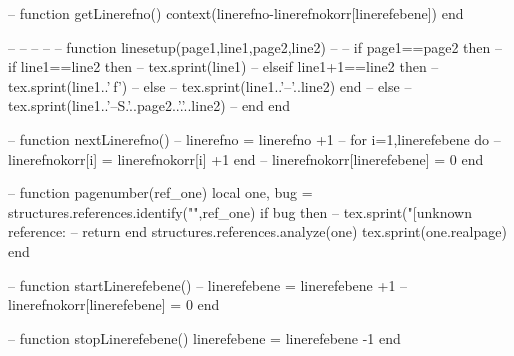 --%
function getLinerefno()
		context(linerefno-linerefnokorr[linerefebene])
end

--%
--%
--%
--%
--%
function linesetup(page1,line1,page2,line2)
	--%
--	if page1==page2 then
		--%
		if line1==line2 then
			--%
			tex.sprint(line1)
		--%
		elseif line1+1==line2 then
			--%
			tex.sprint(line1..' f')
		--%
		else
			--%
			tex.sprint(line1..'–'..line2)
		end
--	else
--		tex.sprint(line1..'–S.'..page2..'.'..line2)
--	end
end

--%
function nextLinerefno()
	--%
	linerefno = linerefno +1
	--%
	for i=1,linerefebene do
		--%
		linerefnokorr[i] = linerefnokorr[i] +1
	end
	--%
	linerefnokorr[linerefebene] = 0
end

--%
function pagenumber(ref_one)
	local one, bug = structures.references.identify("",ref_one)
	if bug then
--		tex.sprint("[unknown reference: %
--		return
	end
	structures.references.analyze(one)
	tex.sprint(one.realpage)
end

--%
function startLinerefebene()
	--%
	linerefebene = linerefebene +1
	--%
	linerefnokorr[linerefebene] = 0
end

--%
function stopLinerefebene()
	linerefebene = linerefebene -1
end

\stopluacode

